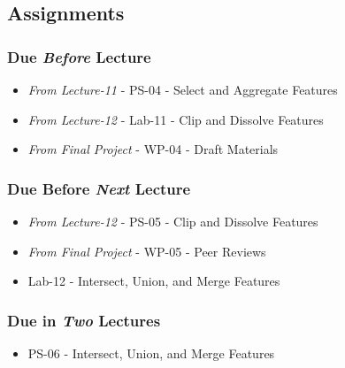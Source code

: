 \documentclass[]{book}
\providecommand{\tightlist}{%
  \setlength{\itemsep}{0pt}\setlength{\parskip}{0pt}}
\begin{document}
\hypertarget{assignments-14}{%
\subsection*{Assignments}\label{assignments-14}}

\hypertarget{due-before-lecture-12}{%
\subsubsection*{\texorpdfstring{Due \emph{Before} Lecture}{Due Before Lecture}}\label{due-before-lecture-12}}

\begin{itemize}
\tightlist
\item
  \emph{From Lecture-11} - PS-04 - Select and Aggregate Features
\item
  \emph{From Lecture-12} - Lab-11 - Clip and Dissolve Features
\item
  \emph{From Final Project} - WP-04 - Draft Materials
\end{itemize}

\hypertarget{due-before-next-lecture-11}{%
\subsubsection*{\texorpdfstring{Due Before \emph{Next} Lecture}{Due Before Next Lecture}}\label{due-before-next-lecture-11}}

\begin{itemize}
\tightlist
\item
  \emph{From Lecture-12} - PS-05 - Clip and Dissolve Features
\item
  \emph{From Final Project} - WP-05 - Peer Reviews
\item
  Lab-12 - Intersect, Union, and Merge Features
\end{itemize}

\hypertarget{due-in-two-lectures-7}{%
\subsubsection*{\texorpdfstring{Due in \emph{Two} Lectures}{Due in Two Lectures}}\label{due-in-two-lectures-7}}

\begin{itemize}
\tightlist
\item
  PS-06 - Intersect, Union, and Merge Features
\end{itemize}
\end{document}

